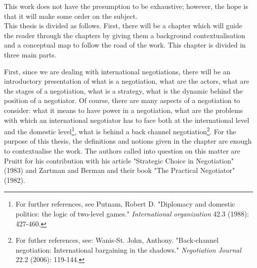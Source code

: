 ﻿\documentclass[../main.tex]{subfiles}
\begin{document}
This work does not have the presumption to be exhaustive; however, the hope is that it will make some order on the subject.\\

This thesis is divided as follows. First, there will be a chapter which will guide the reader through the chapters by giving them a background contextualisation and a  conceptual map to follow the road of the work. 
This chapter is divided in three main parts.

First, since we are dealing with international negotiations, there will be an introductory presentation of what is a negotiation, what are the actors, what are the stages of a negotiation, what is a strategy, what is the dynamic behind the position of a negotiator. Of course, there are many aspects of a negotiation to consider: what it means to have power in a negotiation, what are the problems with which an international negotiator has to face both at the international level and the domestic level\footnote{For further references, see Putnam, Robert D. "Diplomacy and domestic politics: the logic of two-level games." \textit{International organization} 42.3 (1988): 427-460.}, what is behind a back channel negotiation\footnote{For futher references, see: Wanis‐St. John, Anthony. "Back‐channel negotiation: International bargaining in the shadows." \textit{Negotiation Journal} 22.2 (2006): 119-144.}.
For the purpose of this thesis, the definitions and notions given in the chapter are enough to contextualise the work.
The authors called into question on this matter are Pruitt for his contribution with his article "Strategic Choice in Negotiation" (1983) and Zartman and Berman and their book "The Practical Negotiator" (1982).
\end{document}
